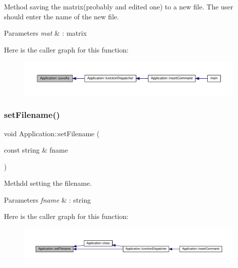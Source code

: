 Method saving the matrix(probably and edited one) to a new file. The user should enter the name of the new file. 
\begin{DoxyParams}{Parameters}
{\em mat} & \+: matrix \\
\hline
\end{DoxyParams}
Here is the caller graph for this function\+:
\nopagebreak
\begin{figure}[H]
\begin{center}
\leavevmode
\includegraphics[width=350pt]{class_application_a10d5a48c95593cee25c1b9e0e257b5a7_icgraph}
\end{center}
\end{figure}
\mbox{\label{class_application_a76de879568ee39ac80484441716928d2}} 
\subsubsection{\texorpdfstring{set\+Filename()}{setFilename()}}
{\footnotesize\ttfamily void Application\+::set\+Filename (\begin{DoxyParamCaption}\item[{const string \&}]{fname }\end{DoxyParamCaption})}

Methdd setting the filename. 
\begin{DoxyParams}{Parameters}
{\em fname} & \+: string \\
\hline
\end{DoxyParams}
Here is the caller graph for this function\+:
\nopagebreak
\begin{figure}[H]
\begin{center}
\leavevmode
\includegraphics[width=350pt]{class_application_a76de879568ee39ac80484441716928d2_icgraph}
\end{center}
\end{figure}
\mbox{\label{class_application_a56b4a55e9eabd40b7f0033ba39631ebe}} 
